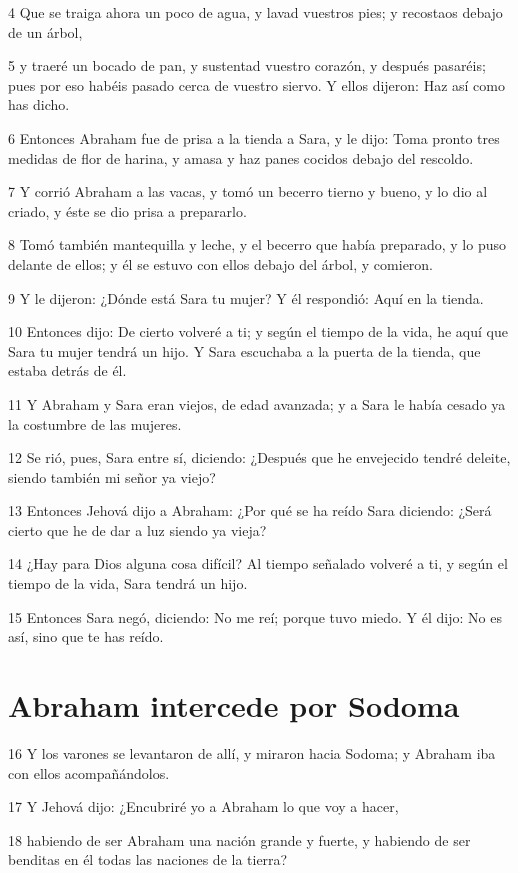 4 Que se traiga ahora un poco de agua, y lavad vuestros pies; y recostaos debajo de un árbol,

5 y traeré un bocado de pan, y sustentad vuestro corazón, y después pasaréis; pues por eso habéis pasado cerca de vuestro siervo. Y ellos dijeron: Haz así como has dicho.

6 Entonces Abraham fue de prisa a la tienda a Sara, y le dijo: Toma pronto tres medidas de flor de harina, y amasa y haz panes cocidos debajo del rescoldo.

7 Y corrió Abraham a las vacas, y tomó un becerro tierno y bueno, y lo dio al criado, y éste se dio prisa a prepararlo.

8 Tomó también mantequilla y leche, y el becerro que había preparado, y lo puso delante de ellos; y él se estuvo con ellos debajo del árbol, y comieron.

9 Y le dijeron: ¿Dónde está Sara tu mujer? Y él respondió: Aquí en la tienda.

10 Entonces dijo: De cierto volveré a ti; y según el tiempo de la vida, he aquí que Sara tu mujer tendrá un hijo. Y Sara escuchaba a la puerta de la tienda, que estaba detrás de él.

11 Y Abraham y Sara eran viejos, de edad avanzada; y a Sara le había cesado ya la costumbre de las mujeres.

12 Se rió, pues, Sara entre sí, diciendo: ¿Después que he envejecido tendré deleite, siendo también mi señor ya viejo?

13 Entonces Jehová dijo a Abraham: ¿Por qué se ha reído Sara diciendo: ¿Será cierto que he de dar a luz siendo ya vieja?

14 ¿Hay para Dios alguna cosa difícil? Al tiempo señalado volveré a ti, y según el tiempo de la vida, Sara tendrá un hijo.

15 Entonces Sara negó, diciendo: No me reí; porque tuvo miedo. Y él dijo: No es así, sino que te has reído.

\section{Abraham intercede por Sodoma}

16 Y los varones se levantaron de allí, y miraron hacia Sodoma; y Abraham iba con ellos acompañándolos.

17 Y Jehová dijo: ¿Encubriré yo a Abraham lo que voy a hacer,

18 habiendo de ser Abraham una nación grande y fuerte, y habiendo de ser benditas en él todas las naciones de la tierra?

